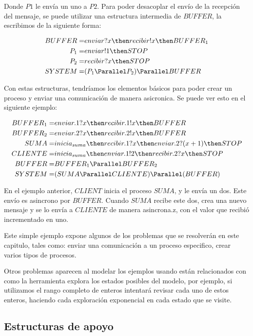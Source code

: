 Donde $P1$ le envía un uno a $P2$. Para poder desacoplar el envío de la recepción del mensaje, se puede utilizar una estructura intermedia de $BUFFER$, la escribimos de la siguiente forma:

\begin{align*}
BUFFER =& enviar?x \then recibir!x \then BUFFER_1 \\
P_1 =& enviar!1 \then STOP \\
P_2 =& recibir?x \then STOP \\
SYSTEM =& ( P_1 \Parallel P_2 ) \Parallel BUFFER \\
\end{align*}

Con estas estructuras, tendríamos los elementos básicos para poder crear un proceso y enviar una comunicación de manera asicronica. Se puede ver esto en el siguiente ejemplo:

\begin{align*}
BUFFER_1 =& enviar.1?x \then recibir.1!x \then BUFFER\\
BUFFER_2 =& enviar.2?x \then recibir.2!x \then BUFFER\\
SUMA =& inicia_{suma} \then recibir.1?x \then enviar.2?(x + 1) \then STOP \\
CLIENTE =& inicia_{suma}\then enviar.1!2 \then recibir.2?x \then STOP \\
BUFFER =& BUFFER_1 \Parallel BUFFER_2 \\
SYSTEM =& (SUMA \Parallel CLIENTE) \Parallel (BUFFER)\\
\end{align*}

En el ejemplo anterior, $CLIENT$ inicia el proceso $SUMA$, y le envía un dos. Este envío es asincrono por $BUFFER$. Cuando $SUMA$ recibe este dos, crea una nuevo mensaje y se lo envía a $CLIENTE$ de manera asincrona.z, con el valor que recibió incrementado en uno.

Este simple ejemplo expone algunos de los problemas que se resolverán en este capitulo, tales como: enviar una comunicación a un proceso especifico, crear varios tipos de procesos.

Otros problemas aparecen al modelar los ejemplos usando \FDR están relacionados con como la herramienta explora los estados posibles del modelo, por ejemplo, si utilizamos el rango completo de enteros intentará revisar cada uno de estos enteros, haciendo cada exploración exponencial en cada estado que se visite.

\subsection{Estructuras de apoyo}

